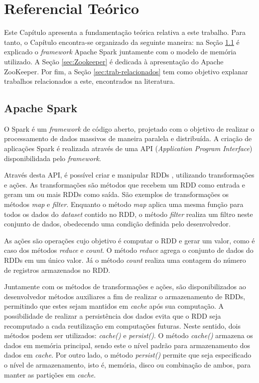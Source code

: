 \chapter{Referencial Teórico} \label{cap:referencial-teorico}
Este Capítulo apresenta a fundamentação teórica relativa a este trabalho. Para tanto, o Capítulo encontra-se organizado da seguinte maneira: na Seção \ref{sec:spark} é explicado o \textit{framework} Apache Spark juntamente com o modelo de memória utilizado. A Seção \ref{sec:Zookeeper} é dedicada à apresentação do Apache ZooKeeper. Por fim, a Seção \ref{sec:trab-relacionados} tem como objetivo explanar trabalhos relacionados a este, encontrados na literatura.

\section{Apache Spark}\label{sec:spark}
O Spark é um \textit{framework} de código aberto, projetado com o objetivo de realizar o processamento de dados massivos de maneira paralela e distribuída. A criação de aplicações Spark é realizada através de uma API (\textit{Application Program Interface}) disponibilidada pelo \textit{framework}. 

Através desta API, é possível criar e manipular RDDs \cite{karau2015learning}, utilizando transformações e ações. As transformações são métodos que recebem um RDD como entrada e geram um ou mais RDDs como saída. São exemplos de transformações os métodos \textit{map} e \textit{filter}. Enquanto o método \textit{map} aplica uma mesma função para todos os dados do \textit{dataset} contido no RDD, o método \textit{filter} realiza um filtro neste conjunto de dados, obedecendo uma condição definida pelo desenvolvedor. 

As ações são operações cujo objetivo é computar o RDD e gerar um valor, como é caso dos métodos \textit{reduce} e \textit{count}. O método \textit{reduce} agrega o conjunto de dados do RDDs em um único valor. Já o método \textit{count} realiza uma contagem do número de registros armazenados no RDD.

Juntamente com os métodos de transformações e ações, são disponibilizados ao desenvolvedor métodos auxiliares a fim de realizar o armazenamento de RDDs, permitindo que estes sejam mantidos em \textit{cache} após sua computação. A possibilidade de realizar a persistência dos dados evita que o RDD seja recomputado a cada reutilização em computações futuras. Neste sentido, dois métodos podem ser utilizados: \textit{cache()} e \textit{persist()}. O método \textit{cache()} armazena os dados em memória principal, sendo este o nível padrão para armazenamento dos dados em \textit{cache}. Por outro lado, o método \textit{persist()} permite que seja especificado o nível de armazenamento, isto é, memória, disco ou combinação de ambos, para manter as partições em \textit{cache}.

